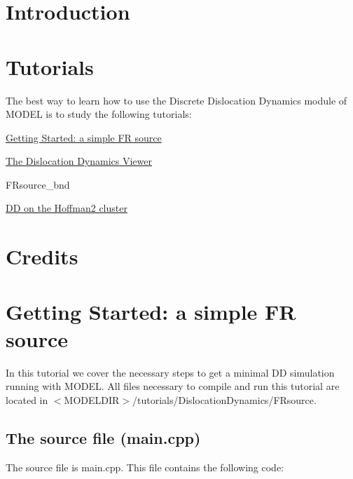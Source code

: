 \hypertarget{_p_i_l_Introduction}{}\section{Introduction}\label{_p_i_l_Introduction}
\hypertarget{_p_i_l_Tutorials}{}\section{Tutorials}\label{_p_i_l_Tutorials}
The best way to learn how to use the Discrete Dislocation Dynamics module of M\+O\+D\+E\+L is to study the following tutorials\+:
\begin{DoxyItemize}
\item \hyperlink{FRsource}{Getting Started\+: a simple F\+R source}
\item \hyperlink{DD_visualization}{The Dislocation Dynamics Viewer}
\item F\+Rsource\+\_\+bnd
\item \hyperlink{hoffman2}{D\+D on the Hoffman2 cluster}
\end{DoxyItemize}\hypertarget{DD_intro.dox_Credits}{}\section{Credits}\label{DD_intro.dox_Credits}
\hypertarget{FRsource}{}\section{Getting Started\+: a simple F\+R source}\label{FRsource}
In this tutorial we cover the necessary steps to get a minimal D\+D simulation running with M\+O\+D\+E\+L. All files necessary to compile and run this tutorial are located in $<$\+M\+O\+D\+E\+L\+D\+I\+R$>$/tutorials/\+Dislocation\+Dynamics/\+F\+Rsource.\hypertarget{_f_rsource_FRsource_main}{}\subsection{The source file (main.\+cpp)}\label{_f_rsource_FRsource_main}
The source file is main.\+cpp. This file contains the following code\+: 

